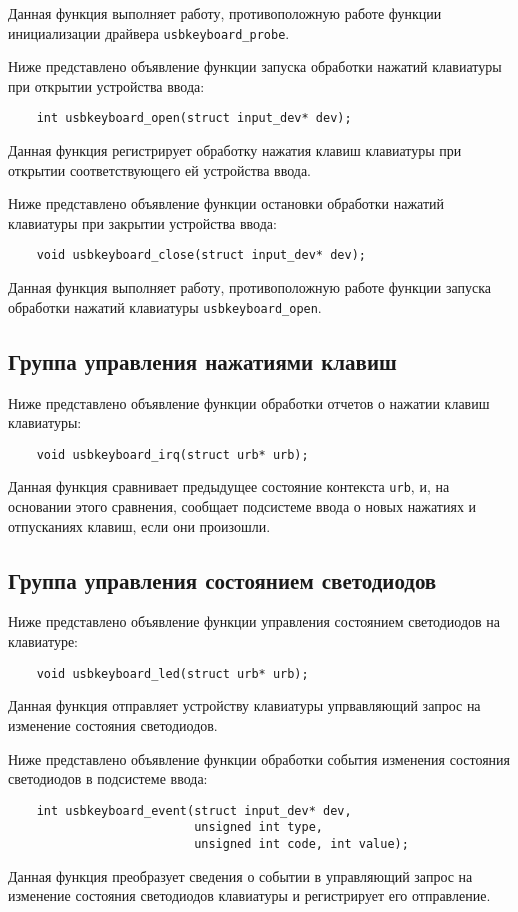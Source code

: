 Данная функция выполняет работу, противоположную работе функции 
инициализации драйвера \texttt{usbkeyboard\_probe}.
%
\pagebreak

Ниже представлено объявление функции запуска обработки нажатий 
клавиатуры при открытии устройства ввода:
\begin{verbatim}
    int usbkeyboard_open(struct input_dev* dev);
\end{verbatim}

Данная функция регистрирует обработку нажатия клавиш
клавиатуры при открытии соответствующего ей устройства ввода.

Ниже представлено объявление функции остановки обработки нажатий
клавиатуры при закрытии устройства ввода:
\begin{verbatim}
    void usbkeyboard_close(struct input_dev* dev);
\end{verbatim}

Данная функция выполняет работу, противоположную работе функции
запуска обработки нажатий клавиатуры \texttt{usbkeyboard\_open}.

\subsection{Группа управления нажатиями клавиш}

Ниже представлено объявление функции обработки отчетов о нажатии 
клавиш клавиатуры:
\begin{verbatim}
    void usbkeyboard_irq(struct urb* urb);
\end{verbatim}

Данная функция сравнивает предыдущее состояние контекста \texttt{urb},
и, на основании этого сравнения, сообщает подсистеме ввода о новых нажатиях
и отпусканиях клавиш, если они произошли.

\subsection{Группа управления состоянием светодиодов}

Ниже представлено объявление функции управления состоянием
светодиодов на клавиатуре:
\begin{verbatim}
    void usbkeyboard_led(struct urb* urb);
\end{verbatim}

Данная функция отправляет устройству клавиатуры 
упрвавляющий запрос на изменение состояния светодиодов.

Ниже представлено объявление функции обработки события изменения
состояния светодиодов в подсистеме ввода:
\begin{verbatim}
    int usbkeyboard_event(struct input_dev* dev, 
                          unsigned int type, 
                          unsigned int code, int value);
\end{verbatim}

Данная функция преобразует сведения о событии в управляющий
запрос на изменение состояния светодиодов клавиатуры и 
регистрирует его отправление.